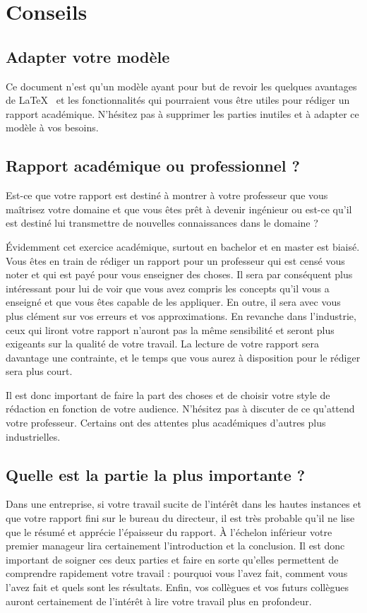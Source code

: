\chapter{Conseils}

\section{Adapter votre modèle}
Ce document n'est qu'un modèle ayant pour but de revoir les quelques avantages de \LaTeX~ et les fonctionnalités qui pourraient vous être utiles pour rédiger un rapport académique. N'hésitez pas à supprimer les parties inutiles et à adapter ce modèle à vos besoins.

\section{Rapport académique ou professionnel ?}

Est-ce que votre rapport est destiné à montrer à votre professeur que vous maîtrisez votre domaine et que vous êtes prêt à devenir ingénieur ou est-ce qu'il est destiné lui transmettre de nouvelles connaissances dans le domaine ?

Évidemment cet exercice académique, surtout en bachelor et en master est biaisé. Vous êtes en train de rédiger un rapport pour un professeur qui est censé vous noter et qui est payé pour vous enseigner des choses. Il sera par conséquent plus intéressant pour lui de voir que vous avez compris les concepts qu'il vous a enseigné et que vous êtes capable de les appliquer. En outre, il sera avec vous plus clément sur vos erreurs et vos approximations. En revanche dans l'industrie, ceux qui liront votre rapport n'auront pas la même sensibilité et seront plus exigeants sur la qualité de votre travail. La lecture de votre rapport sera davantage une contrainte, et le temps que vous aurez à disposition pour le rédiger sera plus court.

Il est donc important de faire la part des choses et de choisir votre style de rédaction en fonction de votre audience. N'hésitez pas à discuter de ce qu'attend votre professeur. Certains ont des attentes plus académiques d'autres plus industrielles.

\section{Quelle est la partie la plus importante ?}

Dans une entreprise, si votre travail sucite de l'intérêt dans les hautes instances et que votre rapport fini sur le bureau du directeur, il est très probable qu'il ne lise que le résumé et apprécie l'épaisseur du rapport. À l'échelon inférieur votre premier manageur lira certainement l'introduction et la conclusion. Il est donc important de soigner ces deux parties et faire en sorte qu'elles permettent de comprendre rapidement votre travail : pourquoi vous l'avez fait, comment vous l'avez fait et quels sont les résultats. Enfin, vos collègues et vos futurs collègues auront certainement de l'intérêt à lire votre travail plus en profondeur.

